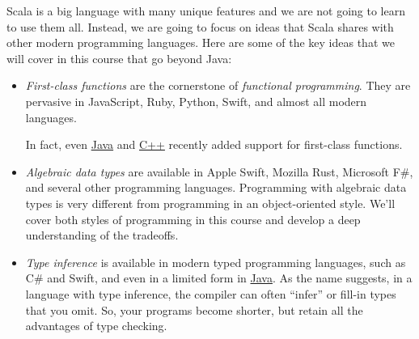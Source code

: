 \documentclass{book}
\begin{document}
Scala is a big language with many unique features and we are not going to learn
to use them all. Instead, we are going to focus on ideas that Scala shares with
other modern programming languages. Here are some of the key ideas that we will
cover in this course that go beyond Java:
%
\begin{itemize}

\item \emph{First-class functions} are the cornerstone of \emph{functional programming}.
  They are pervasive in JavaScript, Ruby, Python, Swift, and almost all modern
  languages.

  In fact, even \href{{http://docs.oracle.com/javase/tutorial/java/javaOO/lambdaexpressions.html}}{Java} and
  \href{http://msdn.microsoft.com/en-us/library/dd293608.aspx}{C++} recently
  added support for first-class functions.

\item \emph{Algebraic data types} are available in Apple Swift, Mozilla Rust,
  Microsoft F\#, and several other programming languages. Programming with
  algebraic data types is very different from programming in an object-oriented
  style. We'll cover both styles of programming in this course and develop
  a deep understanding of the tradeoffs.

\item \emph{Type inference} is available in modern typed programming languages,
  such as C\# and Swift, and even in a limited form in
  \href{http://docs.oracle.com/javase/tutorial/java/generics/genTypeInference.html}{Java}.
  As the name suggests, in a language with type inference, the compiler can
  often ``infer'' or fill-in types that you omit. So, your programs become shorter, but
  retain all the advantages of type checking.

\end{itemize}
\end{document}
